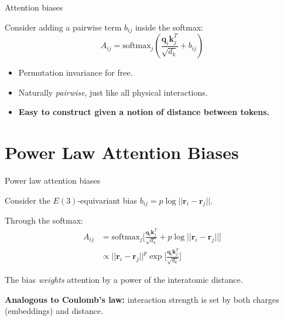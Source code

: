 \documentclass{beamer}
\begin{document}
\begin{frame}{Attention biases}

Consider adding a pairwise term $b_{ij}$ inside the softmax:
\[
A_{ij}=\mathrm{softmax}_j\left( \frac{\mathbf{q}_i \mathbf{k}_j^T}{\sqrt{d_k}} + b_{ij} \right)
\]

\begin{itemize}
    \item Permutation invariance for free. 
    \item Naturally \textit{pairwise}, just like all physical interactions.
    \item \textbf{Easy to construct given a notion of distance between tokens.}
\end{itemize}



\end{frame}

\section{Power Law Attention Biases}

\begin{frame}{Power law attention biases}

Consider the $E(3)$-equivariant bias $b_{ij}=p \log ||\mathbf{r}_i - \mathbf{r}_j||$.

\vspace{1em}

Through the softmax:
\begin{equation*}
\begin{split}
    A_{ij} &= \text{softmax}_j \biggr [\frac{\mathbf{q}_{i} \mathbf{k}_j^T}{\sqrt{d_k}} + p \log || \mathbf{r}_i - \mathbf{r}_j || \biggr] \\
    &\propto || \mathbf{r}_i - \mathbf{r}_j ||^{p}\exp \biggr[ \frac{\mathbf{q}_{i} \mathbf{k}_j^T}{\sqrt{d_k}} \biggr]
\end{split}
\end{equation*}

The bias \textit{weights} attention by a power of the interatomic distance.

\vspace{1em}

\textbf{Analogous to Coulomb's law:} interaction strength is set by both charges (embeddings) and distance.

\end{frame}
\end{document}
